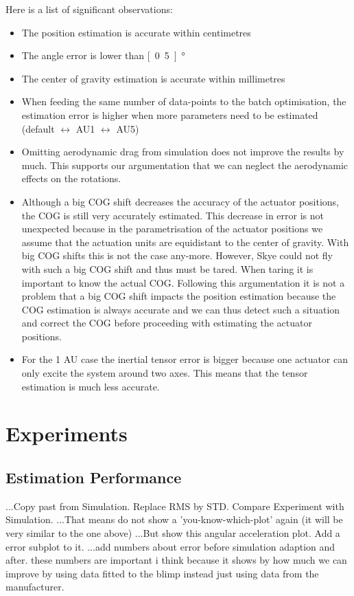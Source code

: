 Here is a list of significant observations:
\begin{itemize}
\item The position estimation is accurate within centimetres
\item The angle error is lower than \unit[0.5]{°}
\item The center of gravity estimation is accurate within millimetres
\item When feeding the same number of data-points to the batch optimisation, the estimation error is higher when more parameters need to be estimated (default $\leftrightarrow$ AU1 $\leftrightarrow$ AU5)
\item Omitting aerodynamic drag from simulation does not improve the results by much. This supports our argumentation that we can neglect the aerodynamic effects on the rotations.
\item Although a big COG shift decreases the accuracy of the actuator positions, the COG is still very accurately estimated. This decrease in error is not unexpected because in the parametrisation of the actuator positions we assume that the actuation units are equidistant to the center of gravity. With big COG shifts this is not the case any-more. However, Skye could not fly with such a big COG shift and thus must be tared. When taring it is important to know the actual COG. Following this argumentation it is not a problem that a big COG shift impacts the position estimation because the COG estimation is always accurate and we can thus detect such a situation and correct the COG before proceeding with estimating the actuator positions.
\item For the 1 AU case the inertial tensor error is bigger because one actuator can only excite the system around two axes. This means that the tensor estimation is much less accurate.
\end{itemize}


\section{Experiments}
\subsection{Estimation Performance}
...Copy past from Simulation. Replace RMS by STD. Compare Experiment with Simulation.
...That means do not show a 'you-know-which-plot' again (it will be very similar to the one above)
...But show this angular acceleration plot. Add a error subplot to it.
...add numbers about error before simulation adaption and after. these numbers are important i think because it shows by how much we can improve by using data fitted to the blimp instead just using data from the manufacturer.
